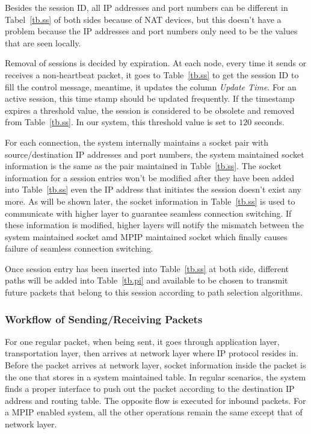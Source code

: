 Besides the session ID, all IP addresses and port numbers can be different in Tabel~\ref{tb.ss} of both sides because of NAT devices, but this doesn't have a problem because the IP addresses and port numbers only need to be the values that are seen locally.

Removal of sessions is decided by expiration. At each node, every time it sends or receives a non-heartbeat packet, it goes to Table~\ref{tb.ss} to get the session ID to fill the control message, meantime, it updates the column \emph{Update Time}. For an active session, this time stamp should be updated frequently. If the timestamp expires a threshold value, the session is considered to be obsolete and removed from Table~\ref{tb.ss}. In our system, this threshold value is set to $120$ seconds.

For each connection, the system internally maintains a socket pair with source/destination IP addresses and port numbers, the system maintained socket information is the same as the pair maintained in Table~\ref{tb.ss}. The socket information for a session entries won't be modified after they have been added into Table~\ref{tb.ss} even the IP address that initiates the session doesn't exist any more. As will be shown later, the socket information in Table~\ref{tb.ss} is used to communicate with higher layer to guarantee seamless connection switching. If these information is modified, higher layers will notify the mismatch between the system maintained socket amd MPIP maintained socket which finally causes failure of seamless connection switching.

Once session entry has been inserted into Table~\ref{tb.ss} at both side, different paths will be added into Table~\ref{tb.pi} and available to be chosen to transmit future packets that belong to this session according to path selection algorithms. 

\subsubsection{Workflow of Sending/Receiving Packets}

For one regular packet, when being sent, it goes through application layer, transportation layer, then arrives at network layer where IP protocol resides in. Before the packet arrives at network layer, socket information inside the packet is the one that stores in a system maintained table. In regular scenarios, the system finds a proper interface to push out the packet according to the destination IP address and routing table. The opposite flow is executed for inbound packets. For a MPIP enabled system, all the other operations remain the same except that of network layer.

